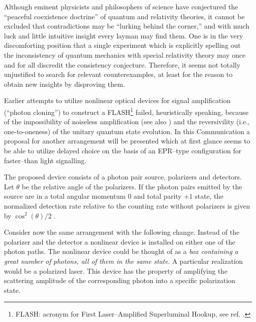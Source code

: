 Although eminent physicists and philosophers of science have
conjectured the ``peaceful coexistence doctrine'' \cite{shimony2} of quantum and relativity theories,
 it cannot be excluded that contradictions may be ``lurking behind the corner,'' and
 with much luck and little intuitive insight every layman may find them.
 One is in the very discomforting position that a single experiment
 which is explicitly spelling out the inconsistency of quantum
 mechanics with special relativity theory may once and for all
 discredit the consistency conjecture.
 Therefore,
 it seems not totally unjustified to search for relevant counterexamples, at least for
 the reason to obtain new insights by disproving them.

      Earlier attempts \cite{herbert} to utilize nonlinear optical
 devices for signal amplification (``photon cloning'') to construct a
 FLASH\footnote{ FLASH: acronym for First Laser--Amplified Superluminal
 Hookup, see ref. \cite{herbert}.} failed, heuristically speaking,
 because of the
 impossibility of noiseless amplification \cite{glauber} (see also
 \cite{wo-zu,mil-hard,mandel:83,bussey})
and the reversivility (i.e., one-to-oneness) of the unitary
quantum state evolution.
In this Communication a proposal for another
 arrangement will be presented which at first glance seems to be able
 to utilize delayed choice on the basis of an EPR--type configuration
 for faster--than light signalling.

      The proposed device consists of a photon pair source, polarizers
 and detectors.  Let $\theta$ be the relative angle of the polarizers.
 If the photon pairs emitted by the source are in a total angular
 momentum 0 and total parity $+1$ state,
 the normalized detection rate relative to the counting rate  without polarizers
 is given by $\cos^2 (\theta )/2$ \cite{clauser}.


      Consider now the same arrangement with the following change.
 Instead of the polarizer and the detector a nonlinear device is
 installed on either one of the photon paths. The nonlinear device
 could be thought of as a {\it box containing a great number of
 photons, all of them
 in the same state}. A particular realization would be a
 polarized laser. This device has the
 property of amplifying the scattering amplitude of the corresponding
 photon into a specific polarization state.

